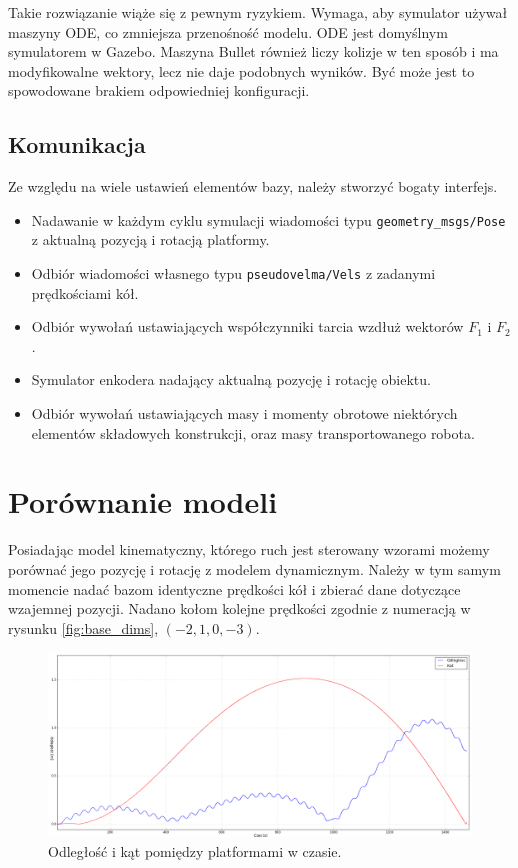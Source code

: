 Takie rozwiązanie wiąże się z pewnym ryzykiem.
Wymaga, aby symulator używał maszyny ODE, co zmniejsza przenośność modelu. ODE jest domyślnym symulatorem w Gazebo.
Maszyna Bullet również liczy kolizje w ten sposób i ma modyfikowalne wektory, lecz nie daje podobnych wyników. Być może jest to spowodowane brakiem odpowiedniej konfiguracji.

\subsection{Komunikacja}
Ze względu na wiele ustawień elementów bazy, należy stworzyć bogaty interfejs.
\begin{itemize}
 \item Nadawanie w każdym cyklu symulacji wiadomości typu \texttt{geometry\_msgs/Pose} z aktualną pozycją i rotacją platformy.
 \item Odbiór wiadomości własnego typu \texttt{pseudovelma/Vels} z zadanymi prędkościami kół.
 \item Odbiór wywołań ustawiających współczynniki tarcia wzdłuż wektorów $F_1$ i $F_2$.
 \item Symulator enkodera nadający aktualną pozycję i rotację obiektu.
 \item Odbiór wywołań ustawiających masy i momenty obrotowe niektórych elementów składowych konstrukcji, oraz masy transportowanego robota.
\end{itemize}

\section{Porównanie modeli}
Posiadając model kinematyczny, którego ruch jest sterowany wzorami możemy porównać jego pozycję i rotację z modelem dynamicznym.
Należy w tym samym momencie nadać bazom identyczne prędkości kół i zbierać dane dotyczące wzajemnej pozycji.
Nadano kołom kolejne prędkości zgodnie z numeracją w rysunku \ref{fig:base_dims}, $(-2 , 1 , 0 , -3)$.

\begin{figure}[H]
\centering
 \includegraphics[width=\textwidth]{graphics/test1.png}
\caption{Odległość i kąt pomiędzy platformami w czasie.}
\end{figure} 

